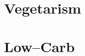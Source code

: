 \documentclass[../main.tex]{subfiles}
\begin{document}
\section{Vegetarism}



\section{Low--Carb}
\end{document}
